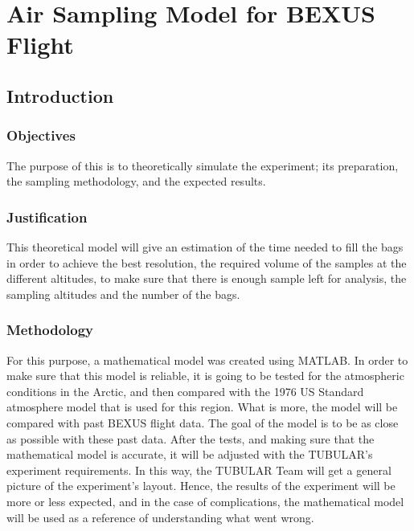 \section{Air Sampling Model for BEXUS Flight}\label{sec:appH}


\subsection{Introduction}


\subsubsection{Objectives}

The purpose of this is to theoretically simulate the experiment; its preparation, the sampling methodology, and the expected results.

\subsubsection{Justification}

This theoretical model will give an estimation of the time needed to fill the bags in order to achieve the best resolution, the required volume of the samples at the different altitudes, to make sure that there is enough sample left for analysis, the sampling altitudes and the number of the bags.  

\subsubsection{Methodology}

For this purpose, a mathematical model was created using MATLAB. In order to make sure that this model is reliable, it is going to be tested for the atmospheric conditions in the Arctic, and then compared with the 1976 US Standard atmosphere model that is used for this region. What is more, the model will be compared with past BEXUS flight data. The goal of the model is to be as close as possible with these past data. 
After the tests, and making sure that the mathematical model is accurate, it will be adjusted with the TUBULAR's experiment requirements. In this way, the TUBULAR Team will get a general picture of the experiment's layout. Hence, the results of the experiment will be more or less expected, and in the case of complications, the mathematical model will be used as a reference of understanding what went wrong.


